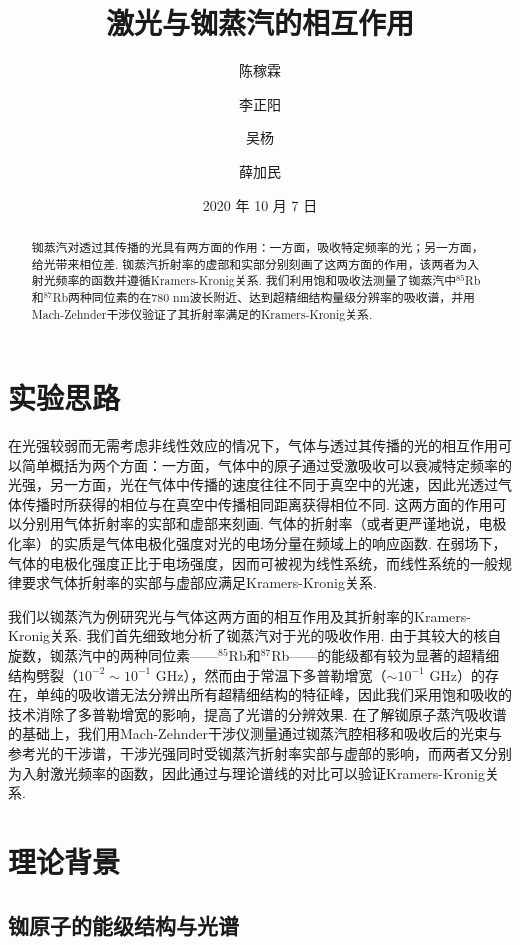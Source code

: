 \documentclass[a4paper, 10pt]{article}
\begin{document}
\title{激光与铷蒸汽的相互作用}
\author{陈稼霖\and 李正阳\and 吴杨\and 薛加民}
\date{2020 年 10 月 7 日}
\maketitle
\begin{abstract}
    铷蒸汽对透过其传播的光具有两方面的作用：一方面，吸收特定频率的光；另一方面，给光带来相位差. 铷蒸汽折射率的虚部和实部分别刻画了这两方面的作用，该两者为入射光频率的函数并遵循Kramers-Kronig关系. 我们利用饱和吸收法测量了铷蒸汽中$^{85}$Rb和$^{87}$Rb两种同位素的在$780$ nm波长附近、达到超精细结构量级分辨率的吸收谱，并用Mach-Zehnder干涉仪验证了其折射率满足的Kramers-Kronig关系.
\end{abstract}

\begin{multicols}{2}
\section{实验思路}
在光强较弱而无需考虑非线性效应的情况下，气体与透过其传播的光的相互作用可以简单概括为两个方面：一方面，气体中的原子通过受激吸收可以衰减特定频率的光强，另一方面，光在气体中传播的速度往往不同于真空中的光速，因此光透过气体传播时所获得的相位与在真空中传播相同距离获得相位不同. 这两方面的作用可以分别用气体折射率的实部和虚部来刻画. 气体的折射率（或者更严谨地说，电极化率）的实质是气体电极化强度对光的电场分量在频域上的响应函数. 在弱场下，气体的电极化强度正比于电场强度，因而可被视为线性系统，而线性系统的一般规律要求气体折射率的实部与虚部应满足Kramers-Kronig关系.

我们以铷蒸汽为例研究光与气体这两方面的相互作用及其折射率的Kramers-Kronig关系. 我们首先细致地分析了铷蒸汽对于光的吸收作用. 由于其较大的核自旋数，铷蒸汽中的两种同位素——$^{85}$Rb和$^{87}$Rb——的能级都有较为显著的超精细结构劈裂（$10^{-2}\sim 10^{-1}$ GHz），然而由于常温下多普勒增宽（$\sim 10^{-1}$ GHz）的存在，单纯的吸收谱无法分辨出所有超精细结构的特征峰，因此我们采用饱和吸收的技术消除了多普勒增宽的影响，提高了光谱的分辨效果. 在了解铷原子蒸汽吸收谱的基础上，我们用Mach-Zehnder干涉仪测量通过铷蒸汽腔相移和吸收后的光束与参考光的干涉谱，干涉光强同时受铷蒸汽折射率实部与虚部的影响，而两者又分别为入射激光频率的函数，因此通过与理论谱线的对比可以验证Kramers-Kronig关系.

\section{理论背景}

\subsection{铷原子的能级结构与光谱}


\end{multicols}
\end{document}
